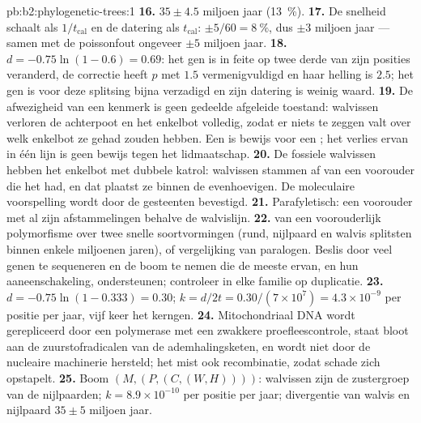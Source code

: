 \begin{solution}{pb:b2:phylogenetic-trees:1}
\textbf{16.} $35 \pm 4.5$ miljoen jaar (\qty{13}{\%}).
\textbf{17.} De snelheid schaalt als $1/t_{\text{cal}}$ en de datering als
$t_{\text{cal}}$: $\pm 5/60 = \qty{8}{\%}$, dus $\pm 3$ miljoen jaar
--- samen met de poissonfout ongeveer $\pm 5$ miljoen jaar.
\textbf{18.} $d = -0.75\ln(1 - 0.6) = 0.69$: het gen is in feite op twee
derde van zijn posities veranderd, de correctie heeft $p$ met $1.5$
vermenigvuldigd en haar helling is $2.5$; het gen is voor deze splitsing bijna
verzadigd en zijn datering is weinig waard.
\textbf{19.} De afwezigheid van een kenmerk is geen gedeelde afgeleide toestand:
walvissen verloren de achterpoot en het enkelbot volledig, zodat er niets
te zeggen valt over welk enkelbot ze gehad zouden hebben. Een  is
bewijs voor een ; het verlies ervan in één lijn is geen bewijs
tegen het lidmaatschap.
\textbf{20.} De fossiele walvissen hebben het enkelbot met dubbele katrol:
walvissen stammen af van een voorouder die het had, en dat plaatst ze binnen
de evenhoevigen. De moleculaire voorspelling wordt door de gesteenten
bevestigd.
\textbf{21.} Parafyletisch: een voorouder met al zijn afstammelingen
behalve de walvislijn.
\textbf{22.}  van een voorouderlijk polymorfisme
over twee snelle soortvormingen (rund, nijlpaard en walvis splitsten binnen
enkele miljoenen jaren), of vergelijking van paralogen. Beslis door
veel genen te sequeneren en de boom te nemen die de meeste ervan, en hun
aaneenschakeling, ondersteunen; controleer in elke familie op duplicatie.
\textbf{23.} $d = -0.75\ln(1 - 0.333) = 0.30$; $k = d/2t =
0.30/(7\times 10^{7}) = 4.3\times 10^{-9}$ per positie per jaar, vijf
keer het kerngen.
\textbf{24.} Mitochondriaal DNA wordt gerepliceerd door een polymerase met
een zwakkere proefleescontrole, staat bloot aan de zuurstofradicalen van de
ademhalingsketen, en wordt niet door de nucleaire machinerie hersteld; het
mist ook recombinatie, zodat schade zich opstapelt.
\textbf{25.} Boom $(M,(P,(C,(W,H))))$: walvissen zijn de zustergroep van
de nijlpaarden; $k = 8.9\times 10^{-10}$ per positie per jaar; divergentie van
walvis en nijlpaard $35 \pm 5$ miljoen jaar.
\end{solution}
